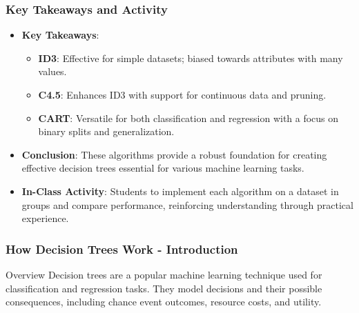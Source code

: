 \documentclass[aspectratio=169]{beamer}
\begin{document}
\begin{frame}[fragile]
    \frametitle{Key Takeaways and Activity}
    \begin{itemize}
        \item \textbf{Key Takeaways}:
        \begin{itemize}
            \item \textbf{ID3}: Effective for simple datasets; biased towards attributes with many values.
            \item \textbf{C4.5}: Enhances ID3 with support for continuous data and pruning.
            \item \textbf{CART}: Versatile for both classification and regression with a focus on binary splits and generalization.
        \end{itemize}
        \item \textbf{Conclusion}: These algorithms provide a robust foundation for creating effective decision trees essential for various machine learning tasks.
        \item \textbf{In-Class Activity}: Students to implement each algorithm on a dataset in groups and compare performance, reinforcing understanding through practical experience.
    \end{itemize}
\end{frame}

\begin{frame}[fragile]
    \frametitle{How Decision Trees Work - Introduction}
    \begin{block}{Overview}
        Decision trees are a popular machine learning technique used for classification and regression tasks.
        They model decisions and their possible consequences, including chance event outcomes, resource costs, and utility.
    \end{block}
\end{frame}
\end{document}
